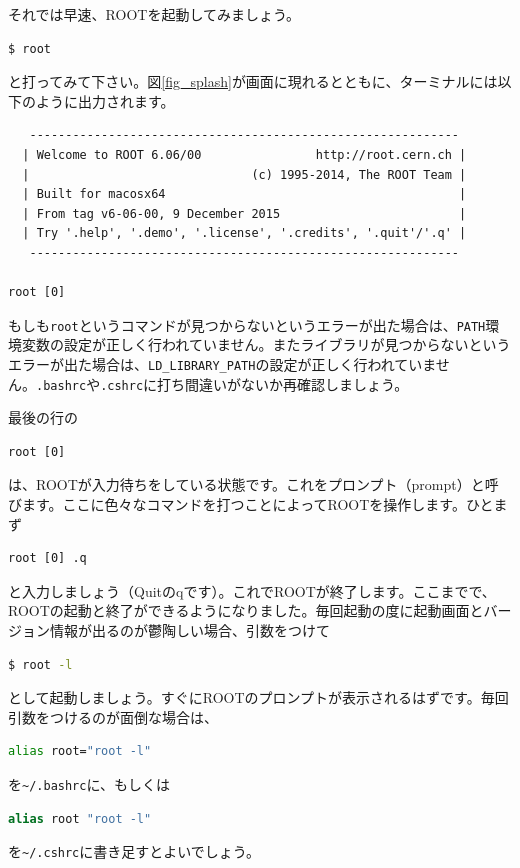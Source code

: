 それでは早速、ROOTを起動してみましょう。
\begin{lstlisting}[language=bash]
$ root
\end{lstlisting}
と打ってみて下さい。図\ref{fig_splash}が画面に現れるとともに、ターミナルには以下のように出力されます。
\begin{lstlisting}
   ------------------------------------------------------------
  | Welcome to ROOT 6.06/00                http://root.cern.ch |
  |                               (c) 1995-2014, The ROOT Team |
  | Built for macosx64                                         |
  | From tag v6-06-00, 9 December 2015                         |
  | Try '.help', '.demo', '.license', '.credits', '.quit'/'.q' |
   ------------------------------------------------------------

root [0] 
\end{lstlisting}
もしも\texttt{root}というコマンドが見つからないというエラーが出た場合は、\texttt{PATH}環境変数の設定が正しく行われていません。またライブラリが見つからないというエラーが出た場合は、\texttt{LD\_LIBRARY\_PATH}の設定が正しく行われていません。\texttt{.bashrc}や\texttt{.cshrc}に打ち間違いがないか再確認しましょう。

最後の行の
\begin{lstlisting}
root [0]
\end{lstlisting}
は、ROOTが入力待ちをしている状態です。これをプロンプト（prompt）と呼びます。ここに色々なコマンドを打つことによってROOTを操作します。ひとまず
\begin{lstlisting}
root [0] .q
\end{lstlisting}
と入力しましょう（Quitのqです）。これでROOTが終了します。ここまでで、ROOTの起動と終了ができるようになりました。毎回起動の度に起動画面とバージョン情報が出るのが鬱陶しい場合、引数をつけて
\begin{lstlisting}[language=bash]
$ root -l
\end{lstlisting}
として起動しましょう。すぐにROOTのプロンプトが表示されるはずです。毎回引数をつけるのが面倒な場合は、
\begin{lstlisting}[language=bash]
alias root="root -l"
\end{lstlisting}
を\texttt{\~{}/.bashrc}に、もしくは
\begin{lstlisting}[language=csh]
alias root "root -l"
\end{lstlisting}
を\texttt{\~{}/.cshrc}に書き足すとよいでしょう。


